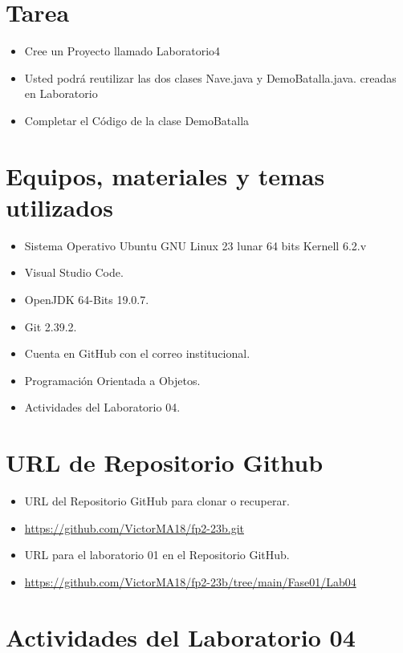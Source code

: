 \documentclass{article}
\begin{document}
	\section{Tarea}
	\begin{itemize}		
        \item Cree un Proyecto llamado Laboratorio4
		\item Usted podrá reutilizar las dos clases Nave.java y DemoBatalla.java. creadas en Laboratorio
		\item Completar el Código de la clase DemoBatalla
	\end{itemize}

	\section{Equipos, materiales y temas utilizados}
	\begin{itemize}
		\item Sistema Operativo Ubuntu GNU Linux 23 lunar 64 bits Kernell 6.2.v
		\item Visual Studio Code.
		\item OpenJDK 64-Bits 19.0.7.
		\item Git 2.39.2.
		\item Cuenta en GitHub con el correo institucional.
		\item Programación Orientada a Objetos.
		\item Actividades del Laboratorio 04.	
	\end{itemize}
	
	\section{URL de Repositorio Github}
	\begin{itemize}
		\item URL del Repositorio GitHub para clonar o recuperar.
		\item \url{https://github.com/VictorMA18/fp2-23b.git}
		\item URL para el laboratorio 01 en el Repositorio GitHub.
		\item \url{https://github.com/VictorMA18/fp2-23b/tree/main/Fase01/Lab04}
	\end{itemize}
	
	\section{Actividades del Laboratorio 04}
	
\end{document}
